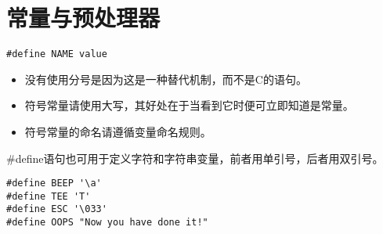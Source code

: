 \section{常量与预处理器}

% 


% 

% 

% 


\begin{frame}[fragile]
\begin{lstlisting}[title=宏定义的一般形式,backgroundcolor=\color{red!10}]
#define NAME value
\end{lstlisting}

\begin{itemize}
\item 没有使用分号是因为这是一种替代机制，而不是C的语句。\\[0.1in]
\item 符号常量请使用大写，其好处在于当看到它时便可立即知道是常量。\\[0.1in]
\item 符号常量的命名请遵循变量命名规则。
\end{itemize}
\end{frame}

\begin{frame}[fragile]
\#define语句也可用于定义字符和字符串变量，前者用单引号，后者用双引号。
\vspace{0.1in}

\begin{lstlisting}
#define BEEP '\a'
#define TEE 'T'
#define ESC '\033'
#define OOPS "Now you have done it!"
\end{lstlisting}

\end{frame}

